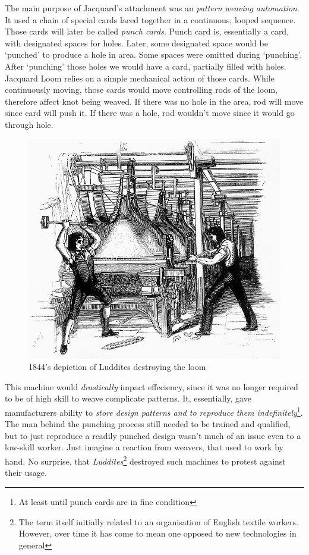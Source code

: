\documentclass[../../what-is-computer]{subfiles}
\begin{document}
    The main purpose of Jacquard's attachment was an \emph{pattern weaving automation}. It used a chain of special cards laced together in a continuous, looped sequence.
    Those cards will later be called \emph{punch cards}. Punch card is, essentially a card, with designated spaces for holes. Later, some designated space would be `punched'
    to produce a hole in area. Some spaces were omitted during `punching'. After `punching' those holes we would have a card, partially filled with holes. Jacquard Loom
    relies on a simple mechanical action of those cards. While continuously moving, those cards would move controlling rods of the loom, therefore affect knot being weaved. 
    If there was no hole in the area, rod will move since card will push it. If there was a hole, rod wouldn't move since it would go through hole. \par


    \begin{figure}
        \centering
        \includegraphics[scale=0.2]{images/misc/luddites.jpg}
        \caption{1844's depiction of Luddites destroying the loom}
    \end{figure}

    This machine would \emph{drastically} impact effeciency, since it was no longer required to be of high skill to weave complicate patterns. It, essentially, gave
    manufacturers ability to \emph{store design patterns and to reproduce them indefinitely}\footnote{At least until punch cards are in fine condition}. The man behind
    the punching process still needed to be trained and qualified, but to just reproduce a readily punched design wasn't much of an issue even to a low-skill worker.
    Just imagine a reaction from weavers, that used to work by hand. No surprise, that \emph{Luddites}\footnote{The term itself initially related to an organisation 
    of English textile workers. However, over time it has come to mean one opposed to new technologies in general}
    destroyed such machines to protest against their usage. \par
\end{document}
